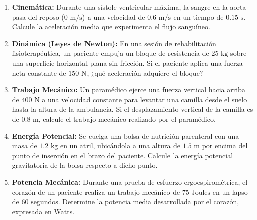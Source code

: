\documentclass[12pt,letterpaper]{article}
\begin{document}
\begin{enumerate}

    \item \textbf{Cinemática:} Durante una sístole ventricular máxima, la sangre en la aorta pasa del reposo ($0 \text{ m/s}$) a una velocidad de $0.6 \text{ m/s}$ en un tiempo de $0.15 \text{ s}$. Calcule la aceleración media que experimenta el flujo sanguíneo.
    \vspace{0.5cm}

    \item \textbf{Dinámica (Leyes de Newton):} En una sesión de rehabilitación fisioterapéutica, un paciente empuja un bloque de resistencia de $25 \text{ kg}$ sobre una superficie horizontal plana sin fricción. Si el paciente aplica una fuerza neta constante de $150 \text{ N}$, ¿qué aceleración adquiere el bloque?
    \vspace{0.5cm}

    \item \textbf{Trabajo Mecánico:} Un paramédico ejerce una fuerza vertical hacia arriba de $400 \text{ N}$ a una velocidad constante para levantar una camilla desde el suelo hasta la altura de la ambulancia. Si el desplazamiento vertical de la camilla es de $0.8 \text{ m}$, calcule el trabajo mecánico realizado por el paramédico.
    \vspace{0.5cm}

    \item \textbf{Energía Potencial:} Se cuelga una bolsa de nutrición parenteral con una masa de $1.2 \text{ kg}$ en un atril, ubicándola a una altura de $1.5 \text{ m}$ por encima del punto de inserción en el brazo del paciente. Calcule la energía potencial gravitatoria de la bolsa respecto a dicho punto.
    \vspace{0.5cm}

    \item \textbf{Potencia Mecánica:} Durante una prueba de esfuerzo ergoespirométrica, el corazón de un paciente realiza un trabajo mecánico de $75 \text{ Joules}$ en un lapso de $60 \text{ segundos}$. Determine la potencia media desarrollada por el corazón, expresada en Watts.
    \vspace{0.5cm}

\end{enumerate}
\end{document}
